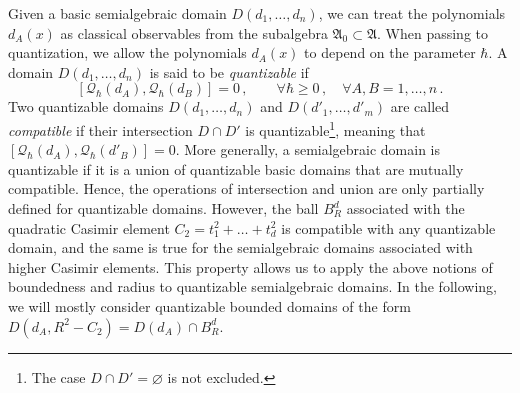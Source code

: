 \documentclass[12pt,a4paper]{article}
\numberwithin{equation}{section}
\theoremstyle{theorem}
\theoremstyle{remark}
\newcommand{\fa}{\mathfrak{A}}
\newcommand{\qq}{\mathcal{Q}_{\hbar}}
\begin{document}
Given  a basic semialgebraic domain  $D(d_1,\ldots,d_n)$, we can treat the polynomials $d_A(x)$ as classical observables from the subalgebra $\fa_0\subset\fa$. When passing to quantization, we allow the polynomials $d_A(x)$ to depend on the parameter $\hbar$. A domain  $D(d_1,\ldots,d_n)$ is said to be {\it quantizable} if 
$$
[\qq(d_A),\qq(d_B)]=0\,,\qquad \forall \hbar\geq 0\,, \quad\forall A,B=1,\ldots,n\,.
$$
Two quantizable domains $D(d_1,\ldots,d_n)$ and $D(d'_1,\ldots,d'_m)$ are called {\it compatible} if their intersection $D\cap D'$ is quantizable\footnote{The case $D\cap D'=\varnothing$ is not excluded.}, meaning that $[\qq(d_A),\qq(d'_B)]=0$. More generally, a semialgebraic  domain is quantizable if it is a union of quantizable basic domains that are mutually compatible.  Hence, the operations of intersection and union are only partially defined for quantizable domains. However, the ball $B^d_R$ associated with the quadratic Casimir element $C_2=t_1^2+\ldots+t_d^2$ is compatible with any quantizable domain, and the same is true for the semialgebraic domains associated with higher Casimir elements. This property allows us to apply the above notions of boundedness and radius to quantizable semialgebraic domains. In the following, we will mostly consider quantizable bounded domains of the form $D(d_A, R^2-C_2)=D(d_A)\cap B^d_R$. 
\end{document}
